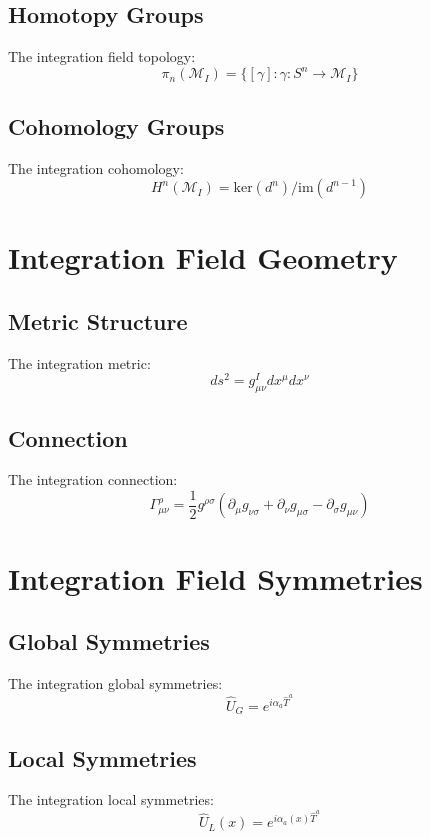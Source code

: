 \documentclass[12pt]{article}
\begin{document}
\subsection{Homotopy Groups}
The integration field topology:
\begin{equation}
\pi_n(\mathcal{M}_I) = \{[\gamma]:\gamma:S^n\to\mathcal{M}_I\}
\end{equation}
\subsection{Cohomology Groups}
The integration cohomology:
\begin{equation}
H^n(\mathcal{M}_I) = \text{ker}(d^n)/\text{im}(d^{n-1})
\end{equation}
\section{Integration Field Geometry}
\subsection{Metric Structure}
The integration metric:
\begin{equation}
ds^2 = g_{\mu\nu}^I dx^\mu dx^\nu
\end{equation}
\subsection{Connection}
The integration connection:
\begin{equation}
\Gamma_{\mu\nu}^{\rho} = \frac{1}{2}g^{\rho\sigma}(\partial_\mu g_{\nu\sigma} + \partial_\nu g_{\mu\sigma} - \partial_\sigma g_{\mu\nu})
\end{equation}
\section{Integration Field Symmetries}
\subsection{Global Symmetries}
The integration global symmetries:
\begin{equation}
\hat{U}_G = e^{i\alpha_a\hat{T}^a}
\end{equation}
\subsection{Local Symmetries}
The integration local symmetries:
\begin{equation}
\hat{U}_L(x) = e^{i\alpha_a(x)\hat{T}^a}
\end{equation}
\end{document}
